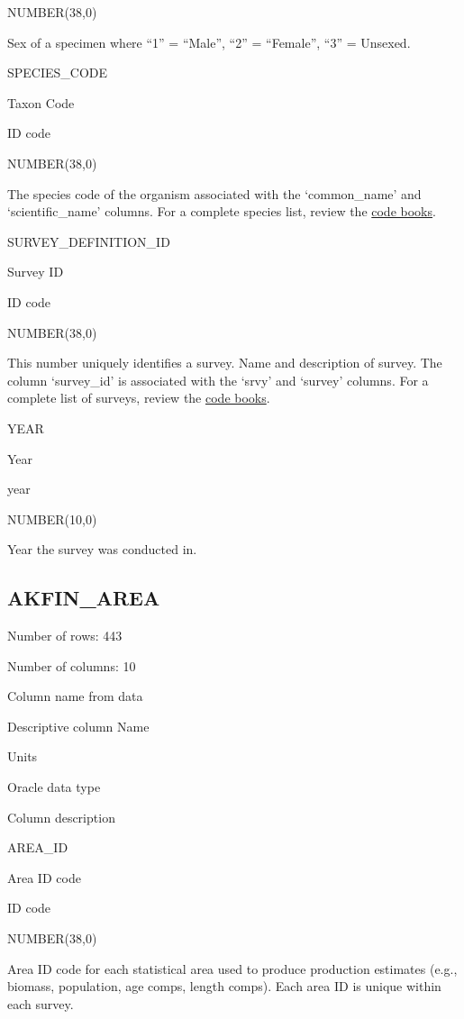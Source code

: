 \documentclass[
  letterpaper,
  oneside,
  open=any]{scrbook}
\begin{document}
NUMBER(38,0)

Sex of a specimen where ``1'' = ``Male'', ``2'' = ``Female'', ``3'' =
Unsexed.

SPECIES\_CODE

Taxon Code

ID code

NUMBER(38,0)

The species code of the organism associated with the `common\_name' and
`scientific\_name' columns. For a complete species list, review the
\href{https://www.fisheries.noaa.gov/resource/document/groundfish-survey-species-code-manual-and-data-codes-manual}{code
books}.

SURVEY\_DEFINITION\_ID

Survey ID

ID code

NUMBER(38,0)

This number uniquely identifies a survey. Name and description of
survey. The column `survey\_id' is associated with the `srvy' and
`survey' columns. For a complete list of surveys, review the
\href{https://www.fisheries.noaa.gov/resource/document/groundfish-survey-species-code-manual-and-data-codes-manual}{code
books}.

YEAR

Year

year

NUMBER(10,0)

Year the survey was conducted in.

\hypertarget{akfin_area}{%
\subsection{AKFIN\_AREA}\label{akfin_area}}

Number of rows: 443

Number of columns: 10

Column name from data

Descriptive column Name

Units

Oracle data type

Column description

AREA\_ID

Area ID code

ID code

NUMBER(38,0)

Area ID code for each statistical area used to produce production
estimates (e.g., biomass, population, age comps, length comps). Each
area ID is unique within each survey.
\end{document}
